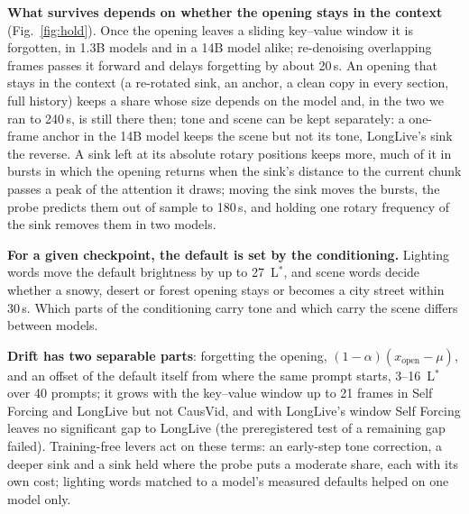 \documentclass[10pt]{article}
\newcommand{\Lstar}{L$^{*}$}
\begin{document}
\textbf{What survives depends on whether the opening stays in the context} (Fig.~\ref{fig:hold}).
Once the opening leaves a sliding key--value window it is forgotten, in 1.3B models and in a 14B model alike;
re-denoising overlapping frames passes it forward and delays forgetting by about 20\,s. An opening that stays in the
context (a re-rotated sink, an anchor, a clean copy in every section, full history) keeps a share whose size
depends on the model and, in the two we ran to 240\,s, is still there then; tone and scene can be kept separately:
a one-frame anchor in the 14B model keeps the scene but not its tone, LongLive's sink the reverse. A sink left at its absolute rotary
positions keeps more, much of it in bursts in which the opening returns when the sink's
distance to the current chunk passes a peak of the attention it draws; moving the sink moves the bursts, the
probe predicts them out of sample to 180\,s, and holding one rotary frequency of the sink removes them in two models.

\textbf{For a given checkpoint, the default is set by the conditioning.} Lighting words move the default brightness
by up to 27~\Lstar, and scene words decide whether a snowy, desert or forest opening stays or becomes a city street
within 30\,s. Which parts of the conditioning carry tone and which carry the scene differs between models.

\textbf{Drift has two separable parts}: forgetting the opening, $(1-\alpha)(x_{\text{open}}-\mu)$, and an
offset of the default itself from where the same prompt starts, 3--16~\Lstar{} over 40 prompts; it grows with the
key--value window up to 21 frames in Self Forcing and LongLive but not CausVid, and with LongLive's window Self Forcing leaves no
significant gap to LongLive (the preregistered test of a remaining gap failed). Training-free levers act on these terms: an early-step tone
correction, a deeper sink and a sink held where the probe puts a moderate share, each with its own cost; lighting words matched to a model's measured defaults helped on
one model only.
\end{document}
